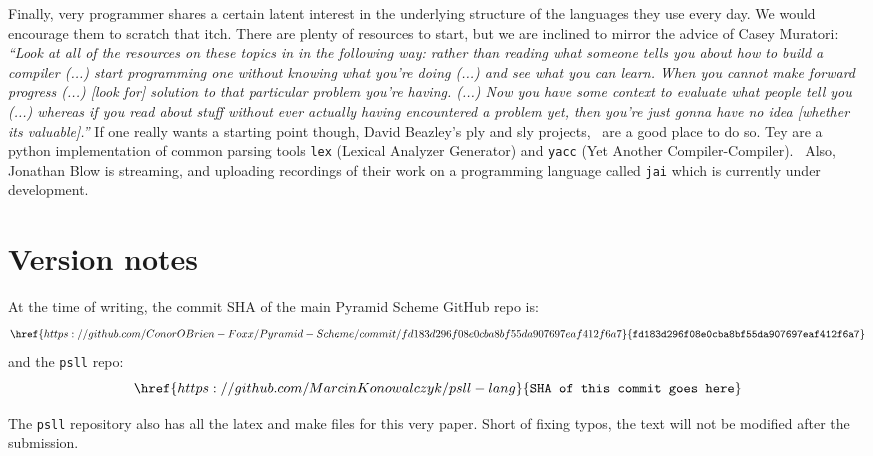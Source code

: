 \documentclass[aip,jcp,reprint,footinbib]{revtex4-1}
\let\tt\texttt
\newcommand\psll{\texttt{psll}\xspace}
\begin{document}
Finally, very programmer shares a certain latent interest in the underlying structure of the languages they use every day. We would encourage them to scratch that itch. There are plenty of resources to start, but we are inclined to mirror the advice of Casey Muratori:~\cite{blow2020qna} \textit{\enquote{Look at all of the resources on these topics in in the following way: rather than reading what someone tells you about how to build a compiler (...) start programming one without knowing what you're doing (...) and see what you can learn. When you cannot make forward progress (...) [look for] solution to that particular problem you're having. (...) Now you have some context to evaluate what people tell you (...) whereas if you read about stuff without ever actually having encountered a problem yet, then you're just gonna have no idea [whether its valuable].}} If one really wants a starting point though, David Beazley's ply and sly projects,~\cite{dbeaz2018,sly,ply} are a good place to do so. Tey are a python implementation of common parsing tools \tt{lex} (Lexical Analyzer Generator) and \tt{yacc} (Yet Another Compiler-Compiler).~\cite{levine1992} Also, Jonathan Blow is streaming, and uploading recordings of their work on a programming language called \tt{jai} which is currently under development.~\cite{blow2020}

\section*{Version notes}

\setlength{\abovedisplayskip}{3pt}
\setlength{\belowdisplayskip}{3pt}

At the time of writing, the commit SHA of the main Pyramid Scheme GitHub repo is:~\cite{pyra_git} 
\[
    \href{https://github.com/ConorOBrien-Foxx/Pyramid-Scheme/commit/fd183d296f08e0cba8bf55da907697eaf412f6a7}{\tt{fd183d296f08e0cba8bf55da907697eaf412f6a7}}
\]
and the \psll repo:~\cite{psll_git}
\[
    \href{https://github.com/MarcinKonowalczyk/psll-lang}{\tt{SHA of this commit goes here}}
\]

The \psll repository also has all the latex and make files for this very paper. Short of fixing typos, the text will not be modified after the submission.
\end{document}
